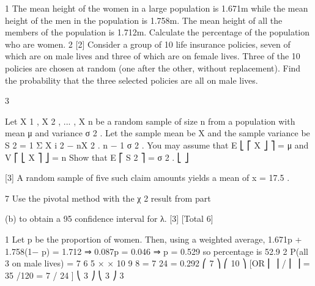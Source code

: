 
1
The mean height of the women in a large population is 1.671m while the mean height
of the men in the population is 1.758m. The mean height of all the members of the
population is 1.712m.
Calculate the percentage of the population who are women.
2
[2]
Consider a group of 10 life insurance policies, seven of which are on male lives and
three of which are on female lives. Three of the 10 policies are chosen at random
(one after the other, without replacement).
Find the probability that the three selected policies are all on male lives.

3

Let X 1 , X 2 , ... , X n be a random sample of size n from a population with mean μ and
variance σ 2 .
Let the sample mean be X and the sample variance be S 2 =
1
{ Σ X i 2 − nX 2 } .
n − 1
σ 2
.
You may assume that E ⎣ ⎡ X ⎦ ⎤ = μ and V ⎡ ⎣ X ⎤ ⎦ =
n
Show that E ⎡ S 2 ⎤ = σ 2 .
⎣ ⎦

[3]
A random sample of five such claim amounts yields a mean of x = 17.5 .
\item 
7
Use the pivotal method with the χ 2 result from part \item (b) to obtain a 95%
confidence interval for λ.
[3]
[Total 6]



1
Let p be the proportion of women.
Then, using a weighted average, 1.671p + 1.758(1− p) = 1.712
⇒ 0.087p = 0.046 ⇒ p = 0.529 so percentage is 52.9%
2
P(all 3 on male lives) =
7 6 5
× ×
10 9 8
=
7
24
= 0.292
⎛ 7 ⎞ ⎛ 10 ⎞
[OR ⎜ ⎟ / ⎜ ⎟ = 35 /120 = 7 / 24 ]
⎝ 3 ⎠ ⎝ 3 ⎠
3

